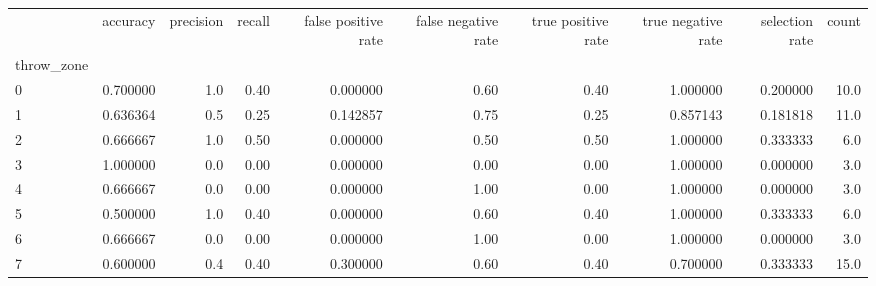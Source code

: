\begin{tabular}{lrrrrrrrrr}
\toprule
{} &  accuracy &  precision &  recall &  false positive rate &  false negative rate &  true positive rate &  true negative rate &  selection rate &  count \\
throw\_zone &           &            &         &                      &                      &                     &                     &                 &        \\
\midrule
0          &  0.700000 &        1.0 &    0.40 &             0.000000 &                 0.60 &                0.40 &            1.000000 &        0.200000 &   10.0 \\
1          &  0.636364 &        0.5 &    0.25 &             0.142857 &                 0.75 &                0.25 &            0.857143 &        0.181818 &   11.0 \\
2          &  0.666667 &        1.0 &    0.50 &             0.000000 &                 0.50 &                0.50 &            1.000000 &        0.333333 &    6.0 \\
3          &  1.000000 &        0.0 &    0.00 &             0.000000 &                 0.00 &                0.00 &            1.000000 &        0.000000 &    3.0 \\
4          &  0.666667 &        0.0 &    0.00 &             0.000000 &                 1.00 &                0.00 &            1.000000 &        0.000000 &    3.0 \\
5          &  0.500000 &        1.0 &    0.40 &             0.000000 &                 0.60 &                0.40 &            1.000000 &        0.333333 &    6.0 \\
6          &  0.666667 &        0.0 &    0.00 &             0.000000 &                 1.00 &                0.00 &            1.000000 &        0.000000 &    3.0 \\
7          &  0.600000 &        0.4 &    0.40 &             0.300000 &                 0.60 &                0.40 &            0.700000 &        0.333333 &   15.0 \\
\bottomrule
\end{tabular}
